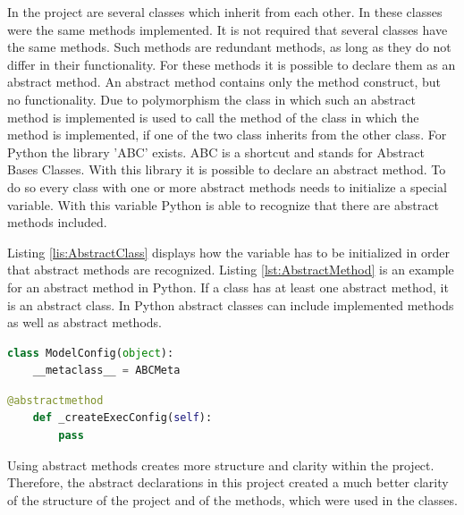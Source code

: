 In the project are several classes which inherit from each other. In these classes were the same methods implemented. It is not required that several classes have the same methods. Such methods are redundant methods, as long as they do not differ in their functionality. For these methods it is possible to declare them as an abstract method. An abstract method contains only the method construct, but no functionality. Due to polymorphism the class in which such an abstract method is implemented is used to call the method of the class in which the method is implemented, if one of the two class inherits from the other class. \newline
For Python the library 'ABC' exists. ABC is a shortcut and stands for Abstract Bases Classes. With this library it is possible to declare an abstract method. To do so every class with one or more abstract methods needs to initialize a special variable. With this variable Python is able to recognize that there are abstract methods included. 

Listing \ref{lis:AbstractClass} displays how the variable has to be initialized in order that abstract methods are recognized. Listing \ref{lst:AbstractMethod} is an example for an abstract method in Python. If a class has at least one abstract method, it is an abstract class. In Python abstract classes can include implemented methods as well as abstract methods.

\begin{lstlisting}[language=Python, caption ={[Initialization of an class variable in order to use the library ABC] The initialization of a class variable which is required by Python in order to detect abstract methods and abstract classes.}, label = lis:AbstractClass]
class ModelConfig(object):
    __metaclass__ = ABCMeta
\end{lstlisting} 

\begin{lstlisting}[language=Python, caption ={[Declaration of an abstract method] Declaration of an abstract method.}, label=lst:AbstractMethod]
    @abstractmethod
    def _createExecConfig(self):
        pass
\end{lstlisting}
Using abstract methods creates more structure and clarity within the project. Therefore, the abstract declarations in this project created a much better clarity of the structure of the project and of the methods, which were used in the classes.

